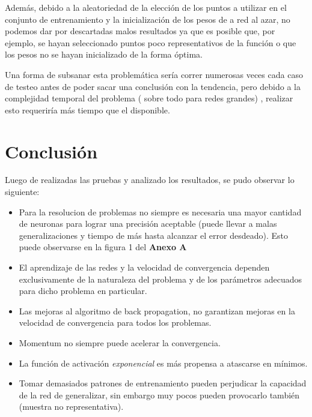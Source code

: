 \documentclass[%
    final,
    reprint,
    notitlepage,
    narroweqnarray,
    inline,
    twoside,
    invited
    ]{ieee}
\begin{document}
\par Además, debido a la aleatoriedad de la elección de los puntos a utilizar en el conjunto de entrenamiento y la inicialización de los pesos de a red al azar, no podemos dar por descartadas malos resultados ya que es posible que, por ejemplo, se hayan seleccionado puntos poco representativos de la función o que los pesos no se hayan inicializado de la forma óptima.
\par Una forma de subsanar esta problemática sería correr numerosas veces cada caso de testeo antes de poder sacar una conclusión con la tendencia, pero debido a la complejidad temporal del problema ( sobre 
todo para redes grandes) , realizar esto requeriría más tiempo que el disponible.

\section{Conclusión}

Luego de realizadas las pruebas y analizado los resultados, se pudo observar lo siguiente:\\
\begin{itemize}
\item Para la resolucion de problemas no siempre es necesaria una mayor cantidad de neuronas para 
lograr una precisión aceptable (puede llevar a malas generalizaciones y tiempo de más 
hasta alcanzar el error desdeado). Esto puede observarse en la figura 1 del \textbf{Anexo A}\\
\item El aprendizaje de las redes y la velocidad de convergencia dependen exclusivamente de la naturaleza del problema 
y de los parámetros adecuados para dicho problema en particular.\\
\item Las mejoras al algoritmo de back propagation, no garantizan mejoras en la velocidad de convergencia para 
todos los problemas.\\
\item Momentum no siempre puede acelerar la convergencia.\\
\item La función de activación \textit{exponencial} es más propensa a atascarse en mínimos.
\item Tomar demasiados patrones de entrenamiento pueden perjudicar la capacidad de la red de generalizar, 
sin embargo muy pocos pueden provocarlo también (muestra no representativa).\\
\end{itemize}
\end{document}

